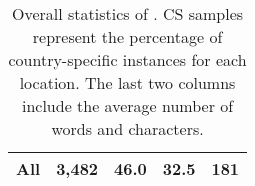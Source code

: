 \begin{table}[t]
{\begin{tabular}{lrrrr}
\textbf{All} & 3,482 & 46.0 & 32.5 & 181 \\ \bottomrule 
\end{tabular}%
}
\caption{Overall statistics of \datasetname. CS samples represent the percentage of country-specific instances for each location. The last two columns include the average number of words and characters.   }
\label{tab:region-data}
\end{table}

